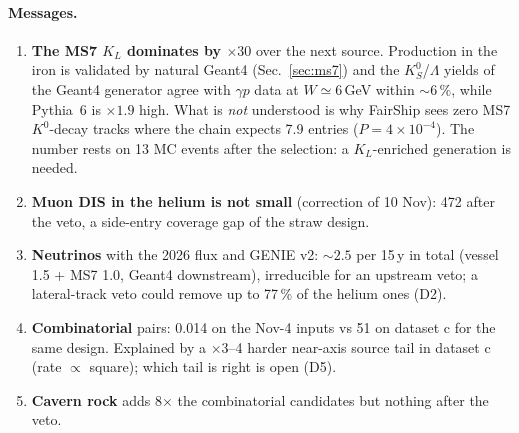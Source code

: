 \paragraph{Messages.}
\begin{enumerate}
\item \textbf{The MS7 $K_L$ dominates by $\times30$} over the next source. Production in the iron is validated by
natural Geant4 (Sec.~\ref{sec:ms7}) and the $K^0_S$/$\Lambda$ yields of the Geant4 generator agree with
$\gamma p$ data at $W\simeq6$\,GeV within $\sim6\,\%$, while Pythia~6 is $\times1.9$ high. What is \emph{not}
understood is why FairShip sees zero MS7 $K^0$-decay tracks where the chain expects 7.9 entries ($P=4\times10^{-4}$).
The number rests on 13 MC events after the selection: a $K_L$-enriched generation is needed.
\item \textbf{Muon DIS in the helium is not small} (correction of 10 Nov): 472 after the veto, a side-entry coverage
gap of the straw design.
\item \textbf{Neutrinos} with the 2026 flux and GENIE v2: $\sim2.5$ per 15\,y in total (vessel 1.5 + MS7 1.0, Geant4
downstream), irreducible for an upstream veto; a lateral-track veto could remove up to 77\,\% of the helium ones (D2).
\item \textbf{Combinatorial} pairs: 0.014 on the Nov-4 inputs vs 51 on dataset c for the same design. Explained by a
$\times3$--4 harder near-axis source tail in dataset c (rate $\propto$ square); which tail is right is open (D5).
\item \textbf{Cavern rock} adds 8$\times$ the combinatorial candidates but nothing after the veto.
\end{enumerate}

